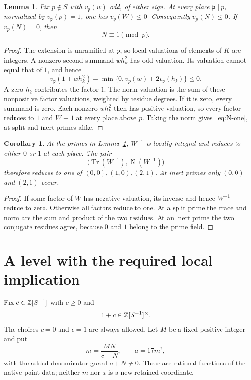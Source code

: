 \documentclass[11pt,a4paper]{article}
\newtheorem{lemma}[theorem]{Lemma}
\newtheorem{corollary}[theorem]{Corollary}
\DeclareMathOperator{\Tr}{Tr}\DeclareMathOperator{\N}{N}
\begin{document}
\begin{lemma}\label{lem:parity}
Fix $p\notin S$ with $v_p(w)$ odd, of either sign.
At every place $\mathfrak p\mid p$, normalized by
$v_{\mathfrak p}(p)=1$, one has $v_{\mathfrak p}(W)\le0$.
Consequently $v_p(N)\le0$. If $v_p(N)=0$, then
\begin{equation}\label{eq:N-one}
                              N\equiv1\pmod p.
\end{equation}
\end{lemma}
\begin{proof}
The extension is unramified at $p$, so local valuations of elements
of $K$ are integers. A nonzero second summand $wh_k^2$ has odd
valuation. Its valuation cannot equal that of $1$, and hence
\[
 v_{\mathfrak p}(1+wh_k^2)
       =\min\{0,v_p(w)+2v_{\mathfrak p}(h_k)\}\le0.
\]
A zero $h_k$ contributes the factor $1$.
The norm valuation is the sum of these nonpositive factor valuations,
weighted by residue degrees. If it is zero, every summand is zero.
Each nonzero $wh_k^2$ then has positive valuation, so every factor
reduces to $1$ and $W\equiv1$ at every place above $p$.
Taking the norm gives~\eqref{eq:N-one}, at split and inert primes alike.
\end{proof}

\begin{corollary}\label{cor:residues}
At the primes in Lemma~\ref{lem:parity}, $W^{-1}$ is locally integral
and reduces to either $0$ or $1$ at each place. The pair
\[
            \bigl(\Tr(W^{-1}),\N(W^{-1})\bigr)
\]
therefore reduces to one of $(0,0),(1,0),(2,1)$.
At inert primes only $(0,0)$ and $(2,1)$ occur.
\end{corollary}
\begin{proof}
If some factor of $W$ has negative valuation, its inverse and hence
$W^{-1}$ reduce to zero. Otherwise all factors reduce to one.
At a split prime the trace and norm are the sum and product of the
two residues. At an inert prime the two conjugate residues agree,
because $0$ and $1$ belong to the prime field.
\end{proof}

\section{A level with the required local implication}

Fix $c\in\mathbb Z[S^{-1}]$ with $c\ge0$ and
\begin{equation}\label{eq:c}
                        1+c\in\mathbb Z[S^{-1}]^\times.
\end{equation}
The choices $c=0$ and $c=1$ are always allowed. Let $M$ be a fixed
positive integer and put
\begin{equation}\label{eq:level}
              m=\frac{MN}{c+N},\qquad a=17m^2,
\end{equation}
with the added denominator guard $c+N\ne0$.
These are rational functions of the native point data; neither $m$
nor $a$ is a new retained coordinate.
\end{document}
